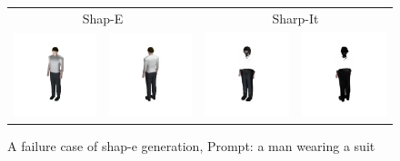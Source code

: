 \begin{figure}[h]
\setlength{\tabcolsep}{1pt}
\begin{tabular}{cccc}
     \multicolumn{2}{c}{Shap-E} & \multicolumn{2}{c}{Sharp-It} \\
    \includegraphics[width=0.25\linewidth]{images/supplementary/failure_case_bad/person_shap_e_r1c1.jpg} &
    \includegraphics[width=0.25\linewidth]{images/supplementary/failure_case_bad/person_shap_e_r2c1.jpg} &
    \includegraphics[width=0.25\linewidth]{images/supplementary/failure_case_bad/person_sharp_e_r1c1.jpg} &
    \includegraphics[width=0.25\linewidth]{images/supplementary/failure_case_bad/person_sharp_e_r2c1.jpg} \\
\end{tabular}
\caption{
A failure case of shap-e generation, Prompt: a man wearing a suit
}

\end{figure}